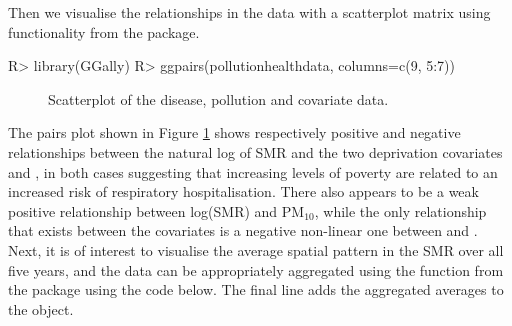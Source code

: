 \documentclass[article, nojss]{jss}
\begin{document}
Then we visualise the relationships in the data with a scatterplot matrix using functionality from the  package.

\begin{Schunk}
\begin{Sinput}
R>  library(GGally)
R>  ggpairs(pollutionhealthdata, columns=c(9, 5:7))
\end{Sinput}
\end{Schunk}



\begin{figure}
\centering 
{}
\caption{Scatterplot of the disease, pollution and covariate data.\label{pollution_scatterplot}}
\end{figure} 


The pairs plot shown in Figure \ref{pollution_scatterplot} shows respectively positive and negative relationships between the natural log of SMR and the two deprivation covariates  and , in both cases suggesting that increasing levels of poverty are related to an increased risk of respiratory hospitalisation. There also appears to be a weak positive relationship between log(SMR) and PM$_{10}$, while the only relationship that exists between the covariates  is a negative non-linear one between  and . Next, it is of interest to visualise the average spatial pattern in the SMR over all five years, and the data can be appropriately aggregated using the  function from the  package using the code below. The final line adds the aggregated averages to the   object.
\end{document}
